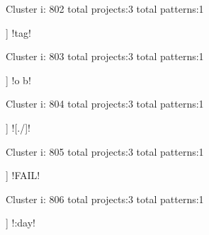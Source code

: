 Cluster i: 802
total projects:3
total patterns:1
\begin{multicols}{1}
\begin{description}[noitemsep,topsep=0pt]
\item [[3] ] \cverb!tag!
\end{description}
\end{multicols}







Cluster i: 803
total projects:3
total patterns:1
\begin{multicols}{1}
\begin{description}[noitemsep,topsep=0pt]
\item [[3] ] \cverb!o b!
\end{description}
\end{multicols}







Cluster i: 804
total projects:3
total patterns:1
\begin{multicols}{1}
\begin{description}[noitemsep,topsep=0pt]
\item [[3] ] \cverb![./]!
\end{description}
\end{multicols}







Cluster i: 805
total projects:3
total patterns:1
\begin{multicols}{1}
\begin{description}[noitemsep,topsep=0pt]
\item [[3] ] \cverb!FAIL!
\end{description}
\end{multicols}







Cluster i: 806
total projects:3
total patterns:1
\begin{multicols}{1}
\begin{description}[noitemsep,topsep=0pt]
\item [[3] ] \cverb!:day!
\end{description}
\end{multicols}







